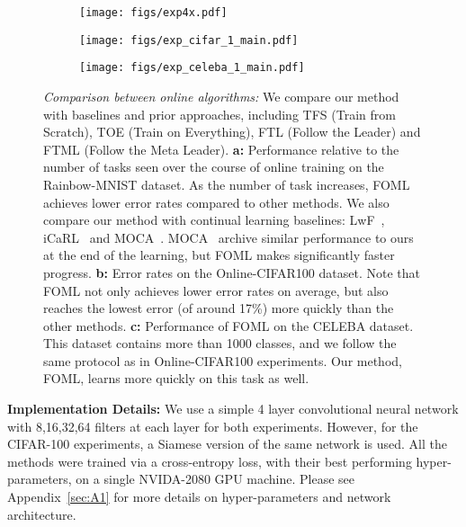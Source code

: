 \begin{figure*}[!t]
\centering
    \begin{subfigure}{0.32\textwidth}
        \centering
        \texttt{[image: figs/exp4x.pdf]}
    \end{subfigure} 
    \begin{subfigure}{0.32\textwidth}
        \centering
        \texttt{[image: figs/exp\_cifar\_1\_main.pdf]}
    \end{subfigure}
    \begin{subfigure}{0.32\textwidth}
        \centering
        \texttt{[image: figs/exp\_celeba\_1\_main.pdf]}
    \end{subfigure}
    \caption{\footnotesize{ \emph{Comparison between online algorithms:} We compare our method with baselines and prior approaches, including TFS (Train from Scratch), TOE (Train on Everything), FTL (Follow the Leader) and FTML (Follow the Meta Leader). \textbf{a:} Performance relative to the number of tasks seen over the course of online training on the Rainbow-MNIST dataset. As the number of task increases, FOML achieves lower error rates compared to other methods. We also compare our method with continual learning baselines: LwF~\citep{li2017learning}, iCaRL~\citep{rebuffi2016icarl} and MOCA~\citep{harrison2020continuous}. MOCA~\cite{harrison2020continuous} archive similar performance to ours at the end of the learning, but FOML makes significantly faster progress. \textbf{b:} Error rates on the Online-CIFAR100 dataset. Note that FOML not only achieves lower error rates on average, but also reaches the lowest error (of around 17\%) more quickly than the other methods. \textbf{c:} Performance of FOML on the CELEBA dataset. This dataset contains more than 1000 classes, and we follow the same protocol as in Online-CIFAR100 experiments. Our method, FOML, learns more quickly on this task as well.}}
    \label{fig:main_plots}

\end{figure*}





\noindent \textbf{Implementation Details:} We use a simple 4 layer convolutional neural network with 8,16,32,64 filters at each layer for both experiments. However, for the CIFAR-100 experiments, a Siamese version of the same network is used. All the methods were trained via a cross-entropy loss, with their best performing hyper-parameters, on a single NVIDA-2080 GPU machine. Please see Appendix~\ref{sec:A1} for more details on hyper-parameters and network architecture.


